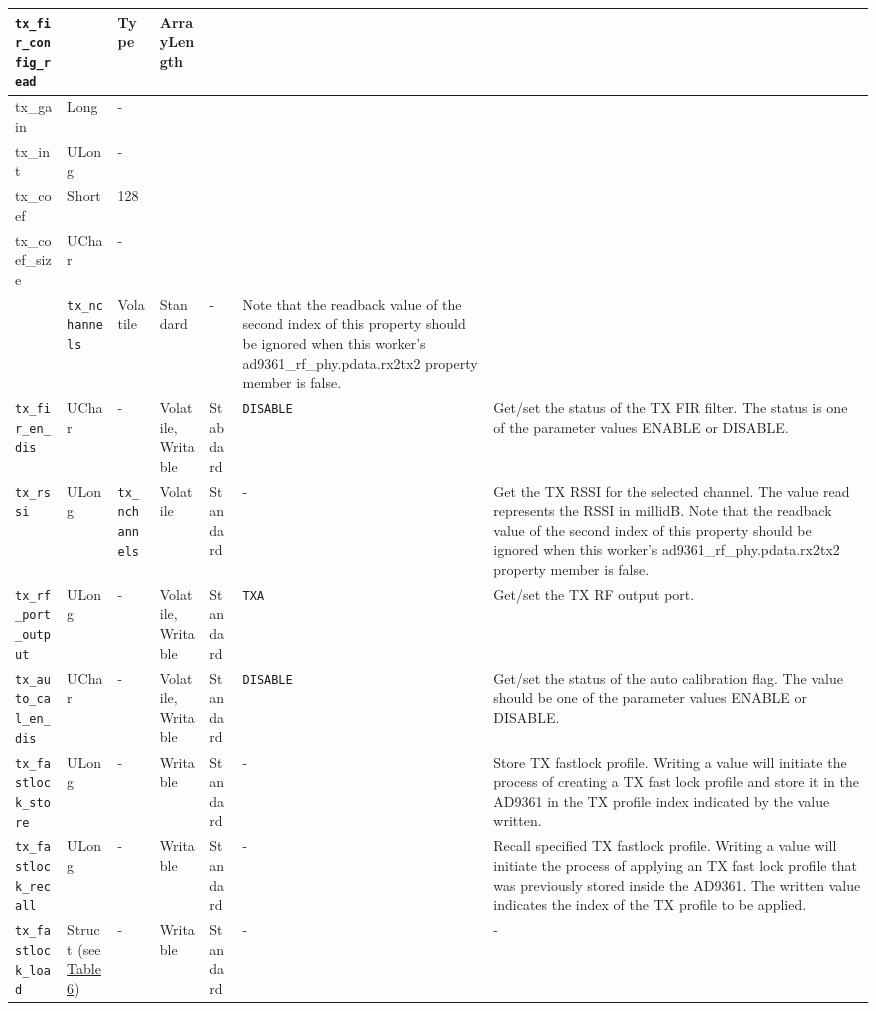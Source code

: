 \documentclass{article}
\begin{document}
\begin{landscape}
\begin{scriptsize}
\begin{longtable}{|p{3.6cm}|p{8.1cm}|p{1.4cm}|p{1.3cm}|p{1.4cm}|p{2.5cm}|p{3.6cm}|}
			\verb+tx_fir_config_read+ & \begin{tabular}{|p{2.2cm}|p{2.7cm}|p{1.7cm}|} \hline \cellcolor{blue} Name & \cellcolor{blue}Type & \cellcolor{blue}ArrayLength \\ \hline tx\_gain & Long & -\\ \hline tx\_int & ULong & -\\ \hline tx\_coef & Short & 128 \\ \hline tx\_coef\_size & UChar & - \\ \hline \end{tabular} & \verb+tx_nchannels+ & Volatile & Standard & - & Note that the readback value of the second index of this property should be ignored when this worker's ad9361\_rf\_phy.pdata.rx2tx2 property member is false. \\
			\hline
			\verb+tx_fir_en_dis+ & UChar & - & Volatile, Writable & Stabdard & \verb+DISABLE+ & Get/set the status of the TX FIR filter. The status is one of the parameter values ENABLE or DISABLE. \\
			\hline
			\verb+tx_rssi+ & ULong & \verb+tx_nchannels+ & Volatile & Standard & - & Get the TX RSSI for the selected channel. The value read represents the RSSI in millidB. Note that the readback value of the second index of this property should be ignored when this worker's ad9361\_rf\_phy.pdata.rx2tx2 property member is false. \\
			\hline
			\verb+tx_rf_port_output+ & ULong & - & Volatile, Writable & Standard & \verb+TXA+ & Get/set the TX RF output port. \\
			\hline
			\verb+tx_auto_cal_en_dis+ & UChar & - & Volatile, Writable & Standard & \verb+DISABLE+ & Get/set the status of the auto calibration flag. The value should be one of the parameter values ENABLE or DISABLE. \\
			\hline
			\verb+tx_fastlock_store+ & ULong & - & Writable & Standard & - & Store TX fastlock profile. Writing a value will initiate the process of creating a TX fast lock profile and store it in the AD9361 in the TX profile index indicated by the value written. \\
			\hline
			\verb+tx_fastlock_recall+ &  ULong & - & Writable & Standard & - & Recall specified TX fastlock profile. Writing a value will initiate the process of applying an TX fast lock profile that was previously stored inside the AD9361. The written value indicates the index of the TX profile to be applied. \\
			\hline
			\verb+tx_fastlock_load+ & Struct (see \hyperlink{tab6}{Table 6}) & - & Writable & Standard & - & - \\

\end{longtable}
\end{scriptsize}
\end{landscape}
\end{document}
